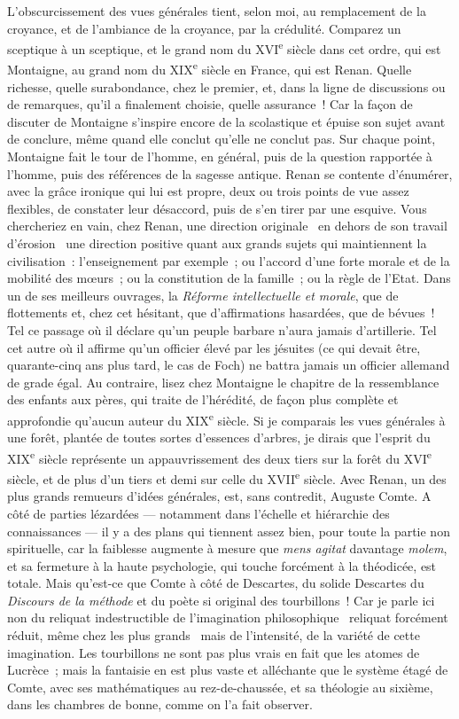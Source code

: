 \documentclass[french,twoside]{book} %
\begin{document}
L’obscurcissement des vues générales tient, selon moi, au remplacement de la croyance, et de l’ambiance de la croyance, par la crédulité. Comparez un sceptique à un sceptique, et le grand nom du XVI\textsuperscript{e} siècle dans cet ordre, qui est Montaigne, au grand nom du XIX\textsuperscript{e} siècle en France, qui est Renan. Quelle richesse, quelle surabondance, chez le premier, et, dans la ligne de discussions ou de remarques, qu’il a finalement choisie, quelle assurance ! Car la façon de discuter de Montaigne s’inspire encore de la scolastique et épuise son sujet avant de conclure, même quand elle conclut qu’elle ne conclut pas. Sur chaque point, Montaigne fait le tour de l’homme, en général, puis de la question rapportée à l’homme, puis des références de la sagesse antique. Renan se contente d’énumérer, avec la grâce ironique qui lui est propre, deux ou trois points de vue assez flexibles, de constater leur désaccord, puis de s’en tirer par une esquive. Vous chercheriez en vain, chez Renan, une direction originale  en dehors de son travail d’érosion  une direction positive quant aux grands sujets qui maintiennent la civilisation : l’enseignement par exemple ; ou l’accord d’une forte morale et de la mobilité des mœurs ; ou la constitution de la famille ; ou la règle de l’Etat. Dans un de ses meilleurs ouvrages, la {\itshape Réforme intellectuelle et morale}, que de flottements et, chez cet hésitant, que d’affirmations hasardées, que de bévues ! Tel ce passage où il déclare qu’un peuple barbare n’aura jamais d’artillerie. Tel cet autre où il affirme qu’un officier élevé par les jésuites (ce qui devait être, quarante-cinq ans plus tard, le cas de Foch) ne battra jamais un officier allemand de grade égal. Au contraire, lisez chez Montaigne le chapitre de la ressemblance des enfants aux pères, qui traite de l’hérédité, de façon plus complète et approfondie qu’aucun auteur du XIX\textsuperscript{e} siècle. Si je comparais les vues générales à une forêt, plantée de toutes sortes d’essences d’arbres, je dirais que l’esprit du XIX\textsuperscript{e} siècle représente un appauvrissement des deux tiers sur la forêt du XVI\textsuperscript{e} siècle, et de plus d’un tiers et demi sur celle du XVII\textsuperscript{e} siècle. Avec Renan, un des plus grands remueurs d’idées générales, est, sans contredit, Auguste Comte. A côté de parties lézardées — notamment dans l’échelle et hiérarchie des connaissances — il y a des plans qui tiennent assez bien, pour toute la partie non spirituelle, car la faiblesse augmente à mesure que {\itshape mens agitat} davantage {\itshape molem}, et sa fermeture à la haute psychologie, qui touche forcément à la théodicée, est totale. Mais qu’est-ce que Comte à côté de Descartes, du solide Descartes du {\itshape Discours de la méthode} et du poète si original des tourbillons ! Car je parle ici non du reliquat indestructible de l’imagination philosophique  reliquat forcément réduit, même chez les plus grands  mais de l’intensité, de la variété de cette imagination. Les tourbillons ne sont pas plus vrais en fait que les atomes de Lucrèce ; mais la fantaisie en est plus vaste et alléchante que le système étagé de Comte, avec ses mathématiques au rez-de-chaussée, et sa théologie au sixième, dans les chambres de bonne, comme on l’a fait observer.\par
\end{document}
